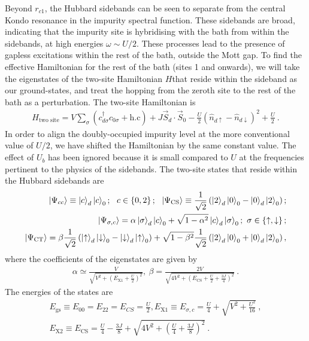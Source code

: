 Beyond \(r_{c1}\), the Hubbard sidebands can be seen to separate from the central Kondo resonance in the impurity spectral function. These sidebands are broad, indicating that the impurity site is hybridising with the bath from within the sidebands, at high energies \(\omega \sim U/2\). These processes lead to the presence of gapless excitations within the rest of the bath, outside the Mott gap. To find the effective Hamiltonian for the rest of the bath (sites 1 and onwards), we will take the eigenstates of the two-site Hamiltonian \(H\)that reside within the sideband as our ground-states, and treat the hopping from the zeroth site to the rest of the bath as a perturbation. The two-site Hamiltonian is
\begin{eqnarray}
	H_\text{two site} = V\sum_\sigma\left(c^\dagger_{d\sigma} c_{0\sigma} + \text{h.c}\right) + J \vec{S}_d\cdot\vec{S}_0 - \frac{U}{2} \left( \hat n_{d \uparrow} - \hat n_{d\downarrow} \right)^2 + \frac{U}{2}~.
\end{eqnarray}
In order to align the doubly-occupied impurity level at the more conventional value of \(U/2\), we have shifted the Hamiltonian by the same constant value. The effect of \(U_b\) has been ignored because it is small compared to \(U\) at the frequencies pertinent to the physics of the sidebands. 
The two-site states that reside within the Hubbard sidebands are
\begin{eqnarray}\label{gs-sideband}
	\ket{\Psi_{cc}} \equiv \ket{c}_d\ket{c}_0; ~ ~ c \in \left\{0,2\right\}; ~ ~\ket{\Psi_\text{CS}} \equiv \frac{1}{\sqrt 2}\left(\ket{2}_d\ket{0}_0 - \ket{0}_d\ket{2}_0\right);\nonumber \\
	\ket{\Psi_{\sigma,c}} = \alpha\ket{\sigma}_d\ket{c}_0 + \sqrt{1 - \alpha^2}\ket{c}_d\ket{\sigma}_0; ~ \sigma \in \left\{\uparrow,\downarrow\right\}; \nonumber\\
	\ket{\Psi_\text{CT}} = \beta\frac{1}{\sqrt 2}\left(\ket{\uparrow}_d\ket{\downarrow}_0 - \ket{\downarrow}_d\ket{\uparrow}_0\right) + \sqrt{1 - \beta^2}\frac{1}{\sqrt 2}\left(\ket{2}_d\ket{0}_0 + \ket{0}_d\ket{2}_0\right),
\end{eqnarray}
where the coefficients of the eigenstates are given by
\begin{eqnarray}
	\alpha \simeq \frac{V}{\sqrt{V^2 + \left(E_\text{X1} + \frac{U}{2}\right)^2 }},  ~ \beta = \frac{2V}{\sqrt{4V^2 + \left(E_\text{CS} + \frac{U}{2} + \frac{3J}{4}\right)^2}}~.
\end{eqnarray}
The energies of the states are
\begin{eqnarray}
	E_\text{gs} \equiv E_{00} = E_{22} = E_{CS} = \frac{U}{2}, E_\text{X1} \equiv E_{\sigma,c} = \frac{U}{4} + \sqrt{V^2 + \frac{U^2}{16}}~, \nonumber\\
	E_\text{X2} \equiv E_\text{CS} = \frac{U}{4} - \frac{3J}{8} + \sqrt{4V^2 + \left(\frac{U}{4} + \frac{3J}{8}\right)^2}~.
\end{eqnarray}
